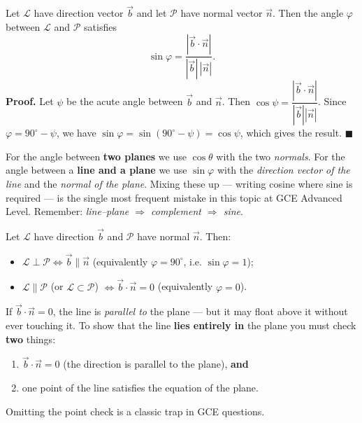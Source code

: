 \documentclass[11pt]{article}
\begin{document}
\begin{propriete}
Let $\mathcal{L}$ have direction vector $\vec{b}$ and let $\mathcal{P}$ have normal vector $\vec{n}$. Then the angle $\varphi$ between $\mathcal{L}$ and $\mathcal{P}$ satisfies
\[
\sin\varphi=\frac{|\vec{b}\cdot\vec{n}|}{|\vec{b}|\,|\vec{n}|}.
\]
\textbf{Proof.} Let $\psi$ be the acute angle between $\vec{b}$ and $\vec{n}$. Then $\cos\psi=\dfrac{|\vec{b}\cdot\vec{n}|}{|\vec{b}||\vec{n}|}$. Since $\varphi=90^{\circ}-\psi$, we have $\sin\varphi=\sin(90^{\circ}-\psi)=\cos\psi$, which gives the result. $\blacksquare$
\end{propriete}

\begin{attention}
For the angle between \textbf{two planes} we use $\cos\theta$ with the two \emph{normals}. For the angle between a \textbf{line and a plane} we use $\sin\varphi$ with the \emph{direction vector of the line} and the \emph{normal of the plane}. Mixing these up — writing cosine where sine is required — is the single most frequent mistake in this topic at GCE Advanced Level. Remember: \emph{line--plane $\Rightarrow$ complement $\Rightarrow$ sine}.
\end{attention}

\begin{propriete}
Let $\mathcal{L}$ have direction $\vec{b}$ and $\mathcal{P}$ have normal $\vec{n}$. Then:
\begin{itemize}
\item $\mathcal{L}\perp\mathcal{P} \iff \vec{b}\parallel\vec{n}$ \quad (equivalently $\varphi=90^{\circ}$, i.e. $\sin\varphi=1$);
\item $\mathcal{L}\parallel\mathcal{P}$ (or $\mathcal{L}\subset\mathcal{P}$) $\iff \vec{b}\cdot\vec{n}=0$ \quad (equivalently $\varphi=0$).
\end{itemize}
\end{propriete}

\begin{attention}
If $\vec{b}\cdot\vec{n}=0$, the line is \emph{parallel to} the plane — but it may float above it without ever touching it. To show that the line \textbf{lies entirely in} the plane you must check \textbf{two} things:
\begin{enumerate}
\item $\vec{b}\cdot\vec{n}=0$ (the direction is parallel to the plane), \textbf{and}
\item one point of the line satisfies the equation of the plane.
\end{enumerate}
Omitting the point check is a classic trap in GCE questions.
\end{attention}
\end{document}

